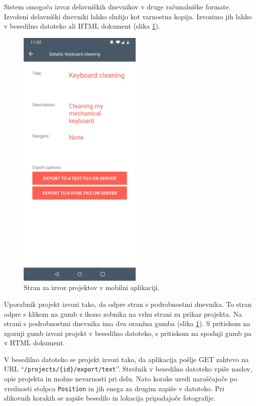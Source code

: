 \documentclass[a4paper, 12pt]{book}
\begin{document}
Sistem omogoča izvoz delavniških dnevnikov v druge računalniške formate.
Izvoženi delavniški dnevniki lahko služijo kot varnostna kopija.
Izvozimo jih lahko v besedilno datoteko ali HTML dokument (slika \ref{app_project_export}).

\begin{figure}[H]
\begin{center}
	\includegraphics[width=6cm]{app_project_export}
\end{center}
	\caption{Stran za izvoz projektov v mobilni aplikaciji.}
\label{app_project_export}
\end{figure}

Uporabnik projekt izvozi tako, da odpre stran s podrobnostmi dnevnika.
To stran odpre s klikom na gumb z ikono zobnika na vrhu strani za prikaz projekta.
Na strani s podrobnostmi dnevnika ima dva oranžna gumba (slika \ref{app_project_export}).
S pritiskom na zgornji gumb izvozi projekt v besedilno datoteko, s pritiskom na spodnji gumb pa v HTML dokument.

V besedilno datoteko se projekt izvozi tako, da aplikacija pošlje GET zahtevo na URL \enquote{\texttt{/projects/\{id\}/export/text}}.
Strežnik v besedilno datoteko vpiše naslov, opis projekta in možne nevarnosti pri delu.
Nato korake uredi naraščajoče po vrednosti stolpca \texttt{Position} in jih enega za drugim zapiše v datoteko.
Pri slikovnih korakih se zapiše besedilo in lokacija pripadajoče fotografije.
\end{document}
